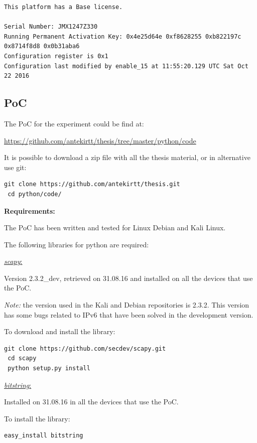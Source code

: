\documentclass[12pt]{article}
\begin{document}
\begin{lstlisting}[style=python,basicstyle=\ttfamily\scriptsize]
This platform has a Base license.

Serial Number: JMX1247Z330
Running Permanent Activation Key: 0x4e25d64e 0xf8628255 0xb822197c 0x8714f8d8 0x0b31aba6 
Configuration register is 0x1
Configuration last modified by enable_15 at 11:55:20.129 UTC Sat Oct 22 2016
\end{lstlisting}

\subsection{PoC}

The PoC for the experiment could be find at:

\vspace{-10pt}
\url{https://github.com/antekirtt/thesis/tree/master/python/code}

It is possible to download a zip file with all the thesis material, or in alternative use git:

\begin{lstlisting}[style=python,basicstyle=\ttfamily\footnotesize]
 git clone https://github.com/antekirtt/thesis.git
 cd python/code/
\end{lstlisting}

\textbf{Requirements:}

\vspace{-15pt}
The PoC has been written and tested for Linux Debian and Kali Linux.

The following libraries for python are required:

\underline{\textit{scapy}:}

Version 2.3.2_dev, retrieved on 31.08.16 and installed on all the devices that use the PoC.

\textit{Note:} the version used in the Kali and Debian repositories is 2.3.2. This version has some bugs related to IPv6 that have been solved in the development version.

To download and install the library:
\begin{lstlisting}[style=python,basicstyle=\ttfamily\footnotesize]
 git clone https://github.com/secdev/scapy.git
 cd scapy
 python setup.py install
\end{lstlisting}

\underline{\textit{bitstring}:}

Installed on 31.08.16 in all the devices that use the PoC.

To install the library:
\begin{lstlisting}[style=python,basicstyle=\ttfamily\footnotesize]
 easy_install bitstring
\end{lstlisting}
\end{document}
